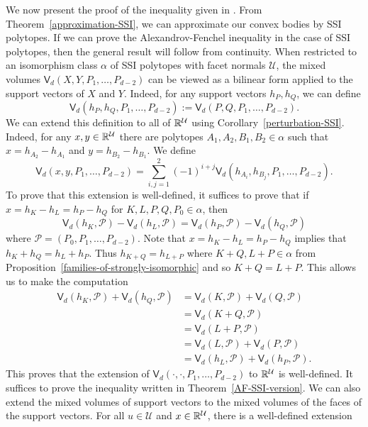 \documentclass{puthesis-UG}
\begin{document}
We now present the proof of the inequality given in \cite{bochner}. From Theorem~\ref{approximation-SSI}, we can approximate our convex bodies by SSI polytopes. If we can prove the Alexandrov-Fenchel inequality in the case of SSI polytopes, then the general result will follow from continuity. When restricted to an isomorphism class $\alpha$ of SSI polytopes with facet normals $\mathcal{U}$, the mixed volumes $\mathsf{V}_d (X, Y, P_1, \ldots, P_{d-2})$ can be viewed as a bilinear form applied to the support vectors of $X$ and $Y$. Indeed, for any support vectors $h_P, h_Q$, we can define 
\[
	\mathsf{V}_d (h_P, h_Q, P_1, \ldots, P_{d-2}) := \mathsf{V}_d (P, Q, P_1, \ldots, P_{d-2}).
\]
We can extend this definition to all of $\mathbb{R}^{\mathcal{U}}$ using Corollary~\ref{perturbation-SSI}. Indeed, for any $x, y \in \mathbb{R}^\mathcal{U}$ there are polytopes $A_1, A_2, B_1, B_2 \in \alpha$ such that $x = h_{A_2} - h_{A_1}$ and $y = h_{B_2} - h_{B_1}$. We define 
\[
	\mathsf{V}_d (x, y, P_1, \ldots, P_{d-2}) = \sum_{i, j = 1}^2 (-1)^{i+j}\mathsf{V}_d (h_{A_i}, h_{B_j}, P_1, \ldots, P_{d-2}).
\]
To prove that this extension is well-defined, it suffices to prove that if $x = h_K - h_L = h_P - h_Q$ for $K, L, P, Q, P_0 \in \alpha$, then 
\[
	\mathsf{V}_d (h_{K}, \mathcal{P}) - \mathsf{V}_d (h_{L}, \mathcal{P}) = \mathsf{V}_d (h_P,\mathcal{P}) - \mathsf{V}_d(h_Q, \mathcal{P})
\]
where $\mathcal{P} = (P_0, P_1, \ldots, P_{d-2})$. Note that $x = h_K - h_L = h_P - h_Q$ implies that $h_K + h_Q = h_L + h_P$. Thus $h_{K+Q} = h_{L+ P}$ where $K+Q, L+P \in \alpha$ from Proposition~\ref{families-of-strongly-isomorphic} and so $K + Q = L + P$. This allows us to make the computation
\begin{align*}
	\mathsf{V}_d(h_K, \mathcal{P}) + \mathsf{V}_d (h_Q, \mathcal{P}) & = \mathsf{V}_d (K, \mathcal{P}) + \mathsf{V}_d (Q, \mathcal{P}) \\
	& = \mathsf{V}_d (K + Q, \mathcal{P}) \\
	& = \mathsf{V}_d (L + P, \mathcal{P}) \\
	& = \mathsf{V}_d(L, \mathcal{P}) + \mathsf{V}_d (P, \mathcal{P}) \\
	& = \mathsf{V}_d(h_L, \mathcal{P}) + \mathsf{V}_d (h_P,\mathcal{P}).
\end{align*}
This proves that the extension of $\mathsf{V}_d (\cdot, \cdot, P_1, \ldots, P_{d-2})$ to $\mathbb{R}^{\mathcal{U}}$ is well-defined. It suffices to prove the inequality written in Theorem~\ref{AF-SSI-version}. We can also extend the mixed volumes of support vectors to the mixed volumes of the faces of the support vectors. For all $u \in \mathcal{U}$ and $x \in \mathbb{R}^\mathcal{U}$, there is a well-defined extension 
\end{document}
